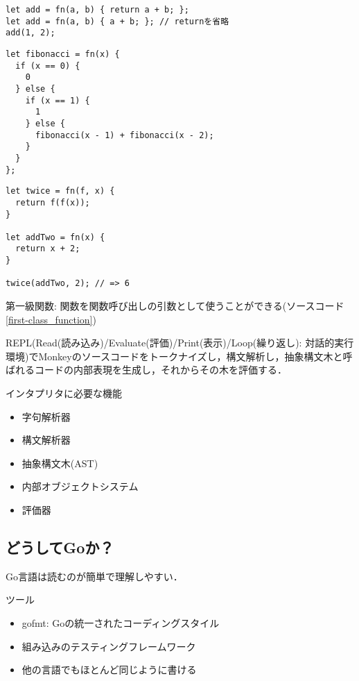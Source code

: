 \begin{lstlisting}[caption=関数に名前を束縛]
let add = fn(a, b) { return a + b; };
let add = fn(a, b) { a + b; }; // returnを省略
add(1, 2);
\end{lstlisting}

\begin{lstlisting}[caption=フィボナッチ数]
let fibonacci = fn(x) {
  if (x == 0) {
    0
  } else {
    if (x == 1) {
      1
    } else {
      fibonacci(x - 1) + fibonacci(x - 2);
    }
  }
};
\end{lstlisting}

\begin{lstlisting}[caption=高階関数, label=first-class_function]
let twice = fn(f, x) {
  return f(f(x));
}

let addTwo = fn(x) {
  return x + 2;
}

twice(addTwo, 2); // => 6
\end{lstlisting}

第一級関数: 関数を関数呼び出しの引数として使うことができる(ソースコード\ref{first-class_function})

REPL(Read(読み込み)/Evaluate(評価)/Print(表示)/Loop(繰り返し): 対話的実行環境)でMonkeyのソースコードをトークナイズし，構文解析し，抽象構文木と呼ばれるコードの内部表現を生成し，それからその木を評価する．

インタプリタに必要な機能

\begin{itemize}
  \item 字句解析器
  \item 構文解析器
  \item 抽象構文木(AST)
  \item 内部オブジェクトシステム
  \item 評価器
\end{itemize}

\subsection{どうしてGoか？}

Go言語は読むのが簡単で理解しやすい．

ツール
\begin{itemize}
  \item gofmt: Goの統一されたコーディングスタイル
  \item 組み込みのテスティングフレームワーク
  \item 他の言語でもほとんど同じように書ける
\end{itemize}
